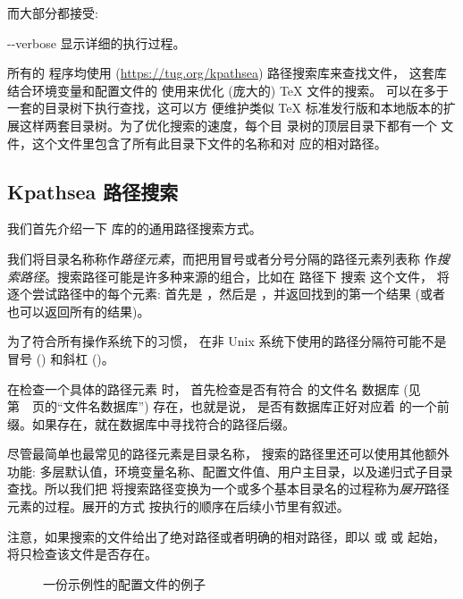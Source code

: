\documentclass{article}
\begin{document}
而大部分都接受: 
\begin{ttdescription}
\item[-{}-verbose] 显示详细的执行过程。
\end{ttdescription}

所有的 \Webc{} 程序均使用 \KPS{} (\url{https://tug.org/kpathsea}) 路径搜索库来查找文件，
这套库结合环境变量和配置文件的
使用来优化 (庞大的) \TeX{} 文件的搜索。\Webc{} 可以在多于一套的目录树下执行查找，这可以方
便维护类似 \TeX{} 标准发行版和本地版本的扩展这样两套目录树。为了优化搜索的速度，每个目
录树的顶层目录下都有一个  文件，这个文件里包含了所有此目录下文件的名称和对
应的相对路径。

\subsection{Kpathsea 路径搜索}
\label{sec:kpathsea}

我们首先介绍一下 \KPS{} 库的的通用路径搜索方式。

我们将目录名称称作\emph{路径元素}，而把用冒号或者分号分隔的路径元素列表称
作\emph{搜索路径}。搜索路径可能是许多种来源的组合，比如在  路径下
搜索  这个文件，\KPS{} 将逐个尝试路径中的每个元素: 首先是
，然后是 ，并返回找到的第一个结果 (或者
也可以返回所有的结果)。

为了符合所有操作系统下的习惯，\KPS{} 在非 Unix 系统下使用的路径分隔符可能不是冒号
(\samp{:}) 和斜杠 (\samp{/})。

在检查一个具体的路径元素  时，\KPS{} 首先检查是否有符合  的文件名
数据库 (见第~\pageref{sec:filename-database}~页的``文件名数据库'') 存在，也就是说，
是否有数据库正好对应着  的一个前缀。如果存在，就在数据库中寻找符合的路径后缀。

尽管最简单也最常见的路径元素是目录名称，\KPS{} 搜索的路径里还可以使用其他额外功能: 
多层默认值，环境变量名称、配置文件值、用户主目录，以及递归式子目录查找。所以我们把 \KPS{}
将搜索路径变换为一个或多个基本目录名的过程称为\emph{展开}路径元素的过程。展开的方式
按执行的顺序在后续小节里有叙述。

注意，如果搜索的文件给出了绝对路径或者明确的相对路径，即以 \samp{/} 或  或
 起始，\KPS{} 将只检查该文件是否存在。

\ifSingleColumn
\else
\begin{figure*}

\setlength{\abovecaptionskip}{0pt}
  \caption{一份示例性的配置文件的例子}
  \label{fig:config-sample}
\end{figure*}
\fi
\end{document}
